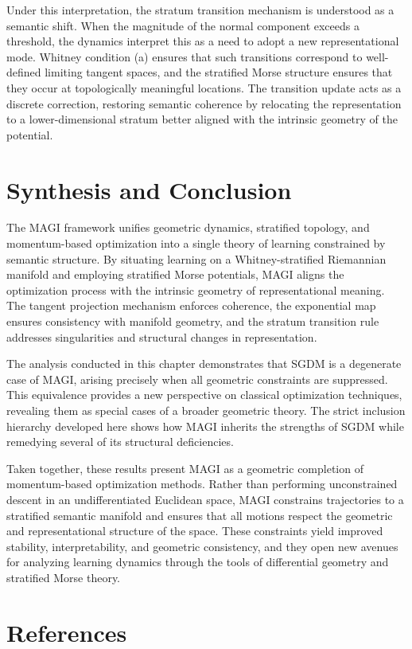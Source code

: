 \documentclass[12pt]{article}
\begin{document}
Under this interpretation, the stratum transition mechanism is understood as a semantic shift. When the magnitude of the normal component exceeds a threshold, the dynamics interpret this as a need to adopt a new representational mode. Whitney condition (a) ensures that such transitions correspond to well-defined limiting tangent spaces, and the stratified Morse structure ensures that they occur at topologically meaningful locations. The transition update acts as a discrete correction, restoring semantic coherence by relocating the representation to a lower-dimensional stratum better aligned with the intrinsic geometry of the potential.


\section{Synthesis and Conclusion}

The MAGI framework unifies geometric dynamics, stratified topology, and momentum-based optimization into a single theory of learning constrained by semantic structure. By situating learning on a Whitney-stratified Riemannian manifold and employing stratified Morse potentials, MAGI aligns the optimization process with the intrinsic geometry of representational meaning. The tangent projection mechanism enforces coherence, the exponential map ensures consistency with manifold geometry, and the stratum transition rule addresses singularities and structural changes in representation.

The analysis conducted in this chapter demonstrates that SGDM is a degenerate case of MAGI, arising precisely when all geometric constraints are suppressed. This equivalence provides a new perspective on classical optimization techniques, revealing them as special cases of a broader geometric theory. The strict inclusion hierarchy developed here shows how MAGI inherits the strengths of SGDM while remedying several of its structural deficiencies.

Taken together, these results present MAGI as a geometric completion of momentum-based optimization methods. Rather than performing unconstrained descent in an undifferentiated Euclidean space, MAGI constrains trajectories to a stratified semantic manifold and ensures that all motions respect the geometric and representational structure of the space. These constraints yield improved stability, interpretability, and geometric consistency, and they open new avenues for analyzing learning dynamics through the tools of differential geometry and stratified Morse theory.

\section*{References}
\printbibliography
\end{document}
